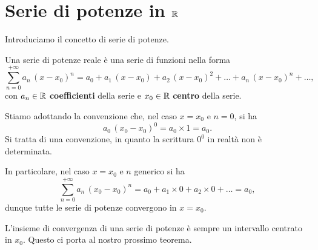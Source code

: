 \documentclass[../../analisi2]{subfiles}
\begin{document}
    \chapter{Serie di potenze in \texorpdfstring{\(\mathbb{R}\)}{R}}

        Introduciamo il concetto di serie di potenze.

        \begin{definizione}
            Una serie di potenze reale è una serie di funzioni nella forma
            \[
                \sum_{n = 0}^{+\infty} a_n \, (x - x_0)^n = a_0 + a_1 \, (x - x_0) + a_2 \, (x - x_0)^2 + \ldots + a_n \, (x - x_0)^n +
                \ldots,
            \]
            con \(a_n \in \mathbb{R}\) \textbf{coefficienti} della serie e \(x_0 \in \mathbb{R}\) \textbf{centro} della serie.
        \end{definizione}
        \begin{osservazione}
            Stiamo adottando la convenzione che, nel caso \(x = x_0\) e \(n = 0\), si ha
            \[
                a_0 \, (x_0 - x_0)^0 = a_0 \times 1 = a_0.
            \]
            Si tratta di una convenzione, in quanto la scrittura \(0^0\) in realtà non è determinata.

            In particolare, nel caso \(x = x_0\) e \(n\) generico si ha
            \[
                \sum_{n = 0}^{+\infty} a_n \, (x_0 - x_0)^n = a_0 + a_1 \times 0 + a_2 \times 0 + \ldots = a_0,
            \]
            dunque tutte le serie di potenze convergono in \(x = x_0\).
        \end{osservazione}

        L'insieme di convergenza di una serie di potenze è sempre un intervallo centrato in \(x_0\). Questo ci porta al nostro
        prossimo teorema.
\end{document}
